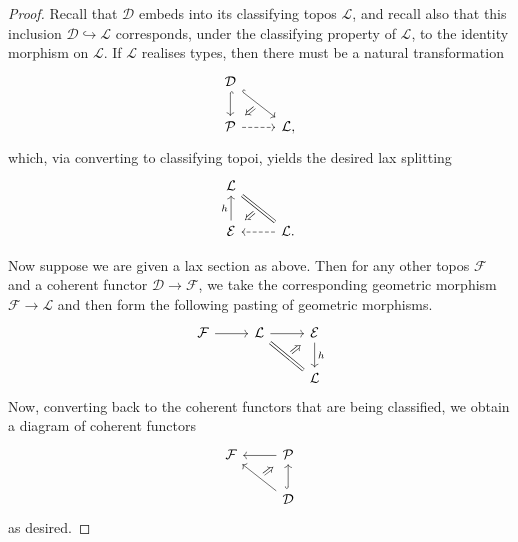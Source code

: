 \documentclass[10pt,a4paper]{amsart}
\newcommand{\dcat}{\mathcal{D}}
\newcommand{\ftopos}{\mathcal{F}}
\newcommand{\locrefl}{\mathcal{L}}
\newcommand{\pretopos}{\mathcal{P}}
\newcommand{\topos}{\mathcal{E}}
\begin{document}
	\begin{proof}
		Recall that $\dcat$ embeds into its classifying topos $\locrefl$, and recall also that this inclusion $\dcat \hookrightarrow \locrefl$ corresponds, under the classifying property of $\locrefl$, to the identity morphism on $\locrefl$.  If $\locrefl$ realises types, then there must be a natural transformation
		\[\begin{tikzcd}
			\dcat & \\
			\pretopos & \locrefl,
			\arrow[hook, from=1-1, to=2-1]
			\arrow[""{name=0, anchor=center, inner sep=0}, hook, from=1-1, to=2-2]
			\arrow[dashed, from=2-1, to=2-2]
			\arrow["\Rightarrow"{marking, allow upside down}, draw=none, from=0, to=2-1]
		\end{tikzcd}\]
		which, via converting to classifying topoi, yields the desired lax splitting
		\[\begin{tikzcd}
			\locrefl & \\
			\topos & \locrefl.
			\arrow[""{name=0, anchor=center, inner sep=0}, equals, from=1-1, to=2-2]
			\arrow["h", from=2-1, to=1-1]
			\arrow[dashed, from=2-2, to=2-1]
			\arrow["\Rightarrow"{marking, allow upside down}, draw=none, from=0, to=2-1]
		\end{tikzcd}\]
		
		Now suppose we are given a lax section as above.  Then for any other topos $\ftopos$ and a coherent functor $\dcat \to \ftopos$, we take the corresponding geometric morphism $\ftopos \to \locrefl$ and then form the following pasting of geometric morphisms.
		\[\begin{tikzcd}
			\ftopos & \locrefl & \topos \\
			&& \locrefl
			\arrow[from=1-1, to=1-2]
			\arrow[from=1-2, to=1-3]
			\arrow[""{name=0, anchor=center, inner sep=0}, equals, from=1-2, to=2-3]
			\arrow["h", from=1-3, to=2-3]
			\arrow["\Rightarrow"{marking, allow upside down}, draw=none, from=0, to=1-3]
		\end{tikzcd}\]
		Now, converting back to the coherent functors that are being classified, we obtain a diagram of coherent functors
		\[\begin{tikzcd}
			\ftopos & \pretopos \\
			& \dcat
			\arrow[from=1-2, to=1-1]
			\arrow[""{name=0, anchor=center, inner sep=0}, from=2-2, to=1-1]
			\arrow[hook, from=2-2, to=1-2]
			\arrow["\Rightarrow"{marking, allow upside down}, draw=none, from=0, to=1-2]
		\end{tikzcd}\]
		as desired.
	\end{proof}
\end{document}
